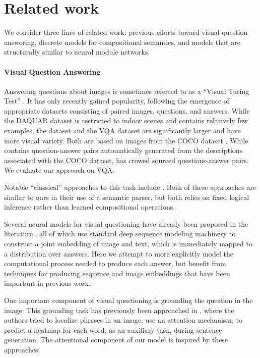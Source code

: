 \section{Related work}
We consider three lines of related work: previous efforts toward visual question
answering, discrete models for compositional semantics, and models that are
structurally similar to neural module networks.

\paragraph{Visual Question Answering}
Answering questions about images is sometimes referred to as a ``Visual
Turing Test'' \cite{malinowski14nips,geman15nas}. It has only recently gained
popularity, following the emergence of appropriate datasets consisting of paired
images, questions, and answers. While the DAQUAR dataset \cite{malinowski14nips}
is restricted to indoor scenes and contains relatively few examples, the \cocoqa
dataset \cite{yu15arxiv} and the VQA dataset \cite{antol15iccv} are
significantly larger and have more visual variety. Both are based on images from
the COCO dataset \cite{lin14eccv}. While \cocoqa contains question-answer pairs
automatically generated from the descriptions associated with the COCO dataset,
\cite{antol15iccv} has crowed sourced questions-answer pairs. We evaluate our
approach on VQA.

Notable ``classical'' approaches to this task include
\cite{malinowski14nips,Krish2013Grounded}. Both of these approaches are similar
to ours in their use of a semantic parser, but both relies on fixed logical
inference rather than learned compositional operations.

Several neural models for visual questioning have already been proposed in the
literature \cite{ren2015image,ma15arxiv,gao2015you}, all of which use standard
deep sequence modeling machinery to construct a joint embedding of image and
text, which is immediately mapped to a distribution over answers. Here we
attempt to more explicitly model the computational process needed to produce
each answer, but benefit from techniques for producing sequence and image
embeddings that have been important in previous work.

One important component of visual questioning is grounding the question in the
image. This grounding task has previously been approached in
\cite{karpathy14nips,plummer15iccv,karpathy15cvpr,kong14cvpr}, where the authors
tried to localize phrases in an image. \cite{xu2015arxiv} use an attention
mechanism, to predict a heatmap for each word, as an auxiliary task, during
sentence generation. The attentional component of our model is inspired by these approaches.

